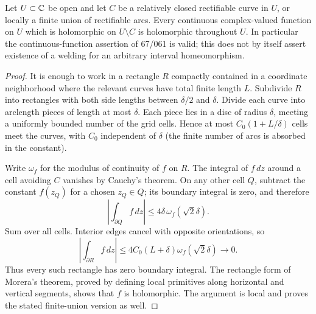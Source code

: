 \begin{lemma}
\label{A3-rectifiable}
Let $U\subset{\ensuremath{\mathbb{C}}}$ be open and let $C$ be a relatively closed
rectifiable curve in $U$, or locally a finite union of rectifiable
arcs. Every continuous complex-valued function on $U$ which is
holomorphic on $U\setminus C$ is holomorphic throughout $U$.
In particular the continuous-function assertion of 67/061 is valid;
this does not by itself assert existence of a welding for an
arbitrary interval homeomorphism.
\end{lemma}
\begin{proof}
It is enough to work in a rectangle $R$ compactly contained in a
coordinate neighborhood where the relevant curves have total
finite length $L$. Subdivide $R$ into rectangles with both side
lengths between $\delta/2$ and $\delta$. Divide each curve into
arclength pieces of length at most $\delta$. Each piece lies in
a disc of radius $\delta$, meeting a uniformly bounded number of
the grid cells. Hence at most $C_0(1+L/\delta)$ cells meet the
curves, with $C_0$ independent of $\delta$ (the finite number of
arcs is absorbed in the constant).

Write $\omega_f$ for the modulus of continuity of $f$ on $R$.
The integral of $f\,dz$ around a cell avoiding $C$ vanishes by
Cauchy's theorem. On any other cell $Q$, subtract the constant
$f(z_Q)$ for a chosen $z_Q\in Q$; its boundary integral is zero,
and therefore
\[
 \left|\int_{\partial Q}f\,dz\right|
       \leq4\delta\,\omega_f(\sqrt2\delta).
\]
Sum over all cells. Interior edges cancel with opposite
orientations, so
\[
 \left|\int_{\partial R}f\,dz\right|
       \leq4C_0(L+\delta)\omega_f(\sqrt2\delta)
       \longrightarrow0.
\]
Thus every such rectangle has zero boundary integral. The
rectangle form of Morera's theorem, proved by defining local
primitives along horizontal and vertical segments, shows that
$f$ is holomorphic. The argument is local and proves the stated
finite-union version as well.
\end{proof}

